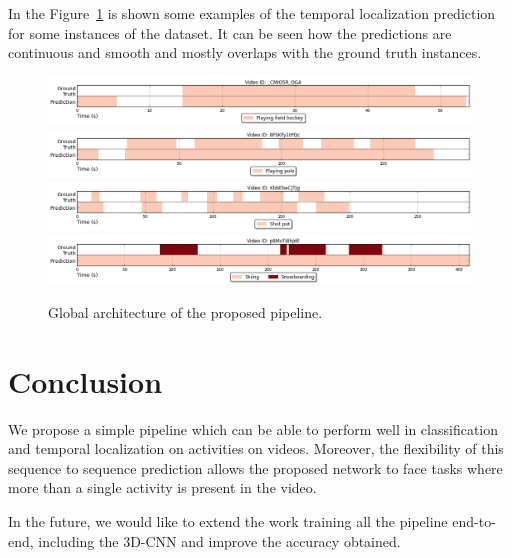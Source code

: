 \documentclass{article}
\begin{document}
In the Figure~\ref{fig:example_results} is shown some examples of the temporal localization prediction for some instances of the dataset. It can be seen how the predictions are continuous and smooth and mostly overlaps with the ground truth instances.

\begin{figure}[ht]
\centering
\includegraphics[width=1\linewidth]{img/activity_temporal_localization_8.png}
\includegraphics[width=1\linewidth]{img/activity_temporal_localization_11.png}
\includegraphics[width=1\linewidth]{img/activity_temporal_localization_20.png}
\includegraphics[width=1\linewidth]{img/activity_temporal_localization_35.png}

\caption{Global architecture of the proposed pipeline.}
\label{fig:example_results}
\end{figure}

\section{Conclusion}

We propose a simple pipeline which can be able to perform well in classification and temporal localization on activities on videos.
Moreover, the flexibility of this sequence to sequence prediction allows the proposed network to face tasks where more than a single activity is present in the video.


In the future, we would like to extend the work training all the pipeline end-to-end, including the 3D-CNN and improve the accuracy obtained.

\section*{}
{\small


}
\end{document}
